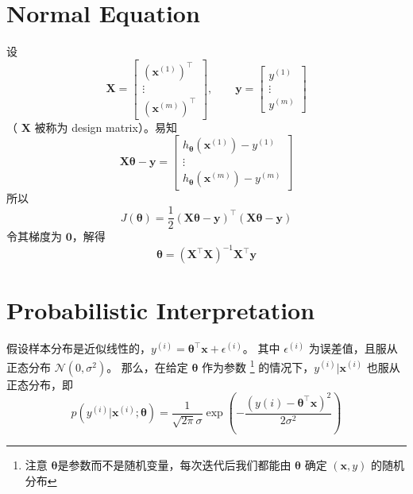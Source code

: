 	\section{Normal Equation}
		设
		\begin{equation*}
			\bm{X} = 
			\begin{bmatrix}
				(\bm{x}^{(1)})^\intercal \\
				\vdots \\
				(\bm{x}^{(m)})^\intercal
			\end{bmatrix}
			, \qquad \bm{y} = 
			\begin{bmatrix}
				y^{(1)} \\
				\vdots \\
				y^{(m)}
			\end{bmatrix}
		\end{equation*}
		（ $ \bm{X} $ 被称为 design matrix）。易知 
		\begin{equation}
			\bm{X} \bm{\theta} - \bm{y} = 
			\begin{bmatrix}
				h_{\bm{\theta}} (\bm{x}^{(1)}) - y^{(1)} \\
				\vdots \\
				h_{\bm{\theta}} (\bm{x}^{(m)}) - y^{(m)} 
			\end{bmatrix}
		\end{equation}
		所以 
		\begin{equation}
			J(\bm{\theta}) = \frac{1}{2} \left( \bm{X} \bm{\theta} - \bm{y} \right)^\intercal \left( \bm{X}\bm{\theta} - \bm{y} \right)
		\end{equation}
		令其梯度为 $ \bm{0} $，解得 
		\begin{equation}
			\bm{\theta} = \left( \bm{X}^\intercal \bm{X} \right) ^{-1} \bm{X}^\intercal \bm{y}
		\end{equation}
		
	\section{Probabilistic Interpretation}
		假设样本分布是近似线性的，$ y^{(i)} = \bm{\theta}^\intercal \bm{x} + \epsilon^{(i)} $。
		其中 $ \epsilon^{(i)} $ 为误差值，且服从正态分布 $ \mathcal{N}(0, \sigma^2) $。
		那么，在给定 $ \bm{\theta} $ 作为参数 
		\footnote{注意 $ \bm{\theta} $是参数而不是随机变量，每次迭代后我们都能由 $ \bm{\theta} $ 确定 $ (\bm{x}, y) $ 的随机分布} 
		的情况下，$ y^{(i)} | \bm{x}^{(i)} $ 也服从正态分布，即
		\begin{equation}
			p(y^{(i)} | \bm{x}^{(i)}; \bm{\theta}) = \frac{1}{\sqrt{2\pi}\sigma} \exp \left( - \frac{(y{(i)} - \bm{\theta}^\intercal 
				\bm{x})^2}{2\sigma^2} \right)
		\end{equation}
		
